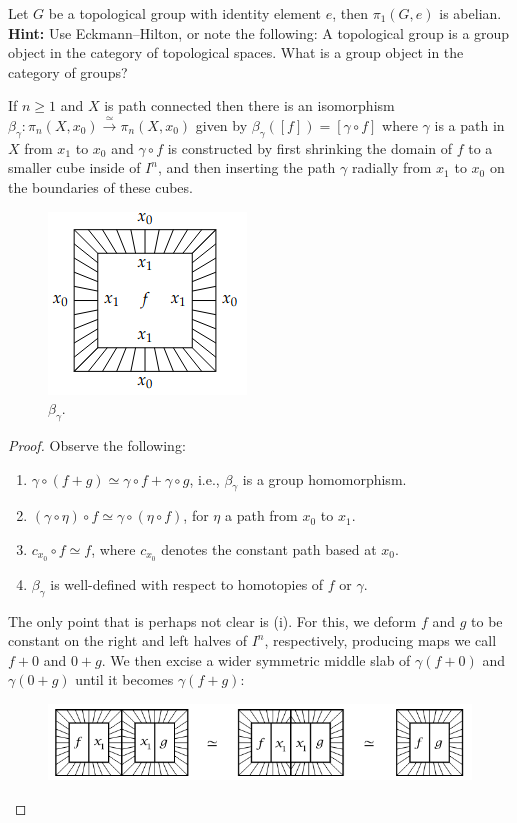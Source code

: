 \documentclass[ma3408.tex]{subfiles}
\begin{document}
\begin{exercise}{}{}
	Let $G$ be a topological group with identity element $e$, then $\pi_1(G,e)$ is abelian. \\
	\textbf{Hint: } Use Eckmann--Hilton, or note the following: A topological group is a group object in the category of topological spaces. What is a group object in the category of groups? 
\end{exercise}
\begin{Prop}
	If $n \ge 1$ and $X$ is path connected then there is an isomorphism $\beta_{\gamma} : \pi_n(X, x_0) \xrightarrow{\simeq} \pi_n(X, x_0)$ given by $\beta_{\gamma}([ f ]) = [\gamma \circ f ]$ where $\gamma$ is a path in $X$ from $x_1$ to $x_0$ and $\gamma \circ f$ is constructed by first shrinking the domain of $f$ to a smaller cube inside of $I^n$, and then inserting the path $\gamma$ radially from $x_1$ to $x_0$ on the boundaries of these cubes.
	\begin{figure}[h] \centering\includegraphics[scale = 0.5]{path.png}\caption{$\beta_{\gamma}$.}\label{fig:marginfig}\end{figure}
\end{Prop}
\begin{proof}
	Observe the following:
	\begin{enumerate}
		\item $\gamma \circ (f + g) \simeq \gamma \circ f + \gamma \circ g$, i.e., $\beta_{\gamma}$ is a group homomorphism.
		\item $(\gamma \circ \eta) \circ f \simeq \gamma \circ (\eta \circ f)$, for $\eta$ a path from $x_0$ to $x_1$. 
		\item $c_{x_0} \circ f \simeq f$, where $c_{x_0}$ denotes the constant path based at $x_0$. 
		\item $\beta_{\gamma}$ is well-defined with respect to homotopies of $f$ or $\gamma$. 
	\end{enumerate}

	The only point that is perhaps not clear is (i). For this, we deform $f$ and $g$ to be constant on the right and left halves of $I^n$, respectively, producing maps we call $f+0$ and $0 + g$. We then excise a wider symmetric middle slab of $\gamma(f+0)$  and $\gamma(0+g)$ until it becomes $\gamma(f+g)$:
\begin{figure}[h] \centering\includegraphics[scale = 0.5]{path_invariance.png}\end{figure}
\end{proof}
\end{document}

